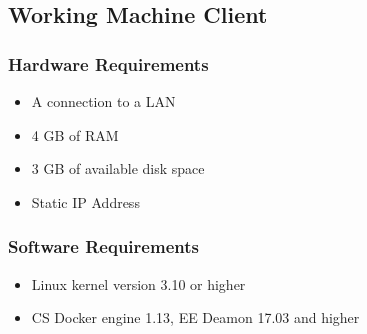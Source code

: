   \subsection{Working Machine Client}
    \subsubsection{Hardware Requirements}  
    \begin{itemize}
      \item A connection to a LAN
      \item 4 GB of RAM
      \item 3 GB of available disk space
      \item Static IP Address
    \end{itemize}
    \subsubsection{Software Requirements}  
    \begin{itemize}
      \item Linux kernel version 3.10 or higher
      \item CS Docker engine 1.13, EE Deamon 17.03 and higher
    \end{itemize}
